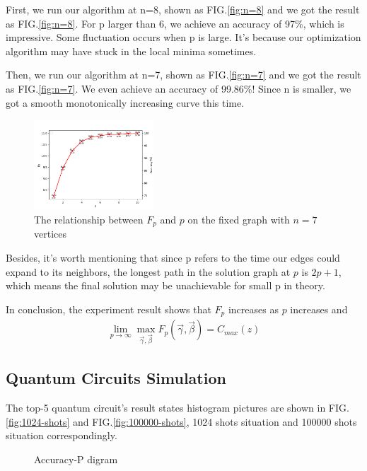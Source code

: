 First, we run our algorithm at n=8, shown as FIG.\ref{fig:n=8} and we got the result as FIG.\ref{fig:n=8}. For p larger than 6, we achieve an accuracy of 97\%, which is impressive. Some fluctuation occurs when p is large. It's because our optimization algorithm may have stuck in the local minima sometimes. 

Then, we run our algorithm at n=7, shown as FIG.\ref{fig:n=7} and we got the result as FIG.\ref{fig:n=7}. We even achieve an accuracy of 99.86\%! Since n is smaller, we got a smooth monotonically increasing curve this time.
\begin{figure}[!htb]
    \centering
        \includegraphics[width=0.4\textwidth]{pic/result_7.png}
        \caption{The relationship between $F_p$ and $p$ on the fixed graph with $n=7$ vertices}
    \label{fig:result_7}
\end{figure}


Besides, it's worth mentioning that since p refers to the time our edges could expand to its neighbors, the longest path in the solution graph at $p$ is $2p+1$\cite{farhi2014quantum}, which means the final solution may be unachievable for small p in theory. 

In conclusion, the experiment result shows that $F_p$ increases as $p$ increases and 
\begin{align*}
    \lim_{p\rightarrow \infty}\max_{\vec{\gamma}, \vec{\beta}}{F_p(\vec{\gamma}, \vec{\beta})}=C_{max}(z)
\end{align*}







\subsection{Quantum Circuits Simulation}


The top-5 quantum circuit's result states histogram pictures are shown in FIG.\ref{fig:1024-shots} and FIG.\ref{fig:100000-shots}, 1024 shots situation and 100000 shots situation correspondingly.
\begin{figure}[!htb]
    \centering
    \caption{Accuracy-P digram}
    \label{fig:Accuracy-P}
\end{figure}

